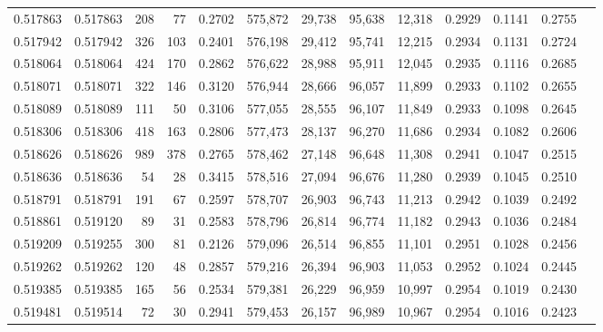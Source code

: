 \begin{tabular}{rrrrrrrrrrrrr}
0.517863 & 0.517863 &   208 &    77 &                                     0.2702 & 575,872 &  29,738 &  95,638 &  12,318 & 0.2929 & 0.1141 & 0.2755 \\
0.517942 & 0.517942 &   326 &   103 &                                     0.2401 & 576,198 &  29,412 &  95,741 &  12,215 & 0.2934 & 0.1131 & 0.2724 \\
0.518064 & 0.518064 &   424 &   170 &                                     0.2862 & 576,622 &  28,988 &  95,911 &  12,045 & 0.2935 & 0.1116 & 0.2685 \\
0.518071 & 0.518071 &   322 &   146 &                                     0.3120 & 576,944 &  28,666 &  96,057 &  11,899 & 0.2933 & 0.1102 & 0.2655 \\
0.518089 & 0.518089 &   111 &    50 &                                     0.3106 & 577,055 &  28,555 &  96,107 &  11,849 & 0.2933 & 0.1098 & 0.2645 \\
0.518306 & 0.518306 &   418 &   163 &                                     0.2806 & 577,473 &  28,137 &  96,270 &  11,686 & 0.2934 & 0.1082 & 0.2606 \\
0.518626 & 0.518626 &   989 &   378 &                                     0.2765 & 578,462 &  27,148 &  96,648 &  11,308 & 0.2941 & 0.1047 & 0.2515 \\
0.518636 & 0.518636 &    54 &    28 &                                     0.3415 & 578,516 &  27,094 &  96,676 &  11,280 & 0.2939 & 0.1045 & 0.2510 \\
0.518791 & 0.518791 &   191 &    67 &                                     0.2597 & 578,707 &  26,903 &  96,743 &  11,213 & 0.2942 & 0.1039 & 0.2492 \\
0.518861 & 0.519120 &    89 &    31 &                                     0.2583 & 578,796 &  26,814 &  96,774 &  11,182 & 0.2943 & 0.1036 & 0.2484 \\
0.519209 & 0.519255 &   300 &    81 &                                     0.2126 & 579,096 &  26,514 &  96,855 &  11,101 & 0.2951 & 0.1028 & 0.2456 \\
0.519262 & 0.519262 &   120 &    48 &                                     0.2857 & 579,216 &  26,394 &  96,903 &  11,053 & 0.2952 & 0.1024 & 0.2445 \\
0.519385 & 0.519385 &   165 &    56 &                                     0.2534 & 579,381 &  26,229 &  96,959 &  10,997 & 0.2954 & 0.1019 & 0.2430 \\
0.519481 & 0.519514 &    72 &    30 &                                     0.2941 & 579,453 &  26,157 &  96,989 &  10,967 & 0.2954 & 0.1016 & 0.2423 \\

\end{tabular}
